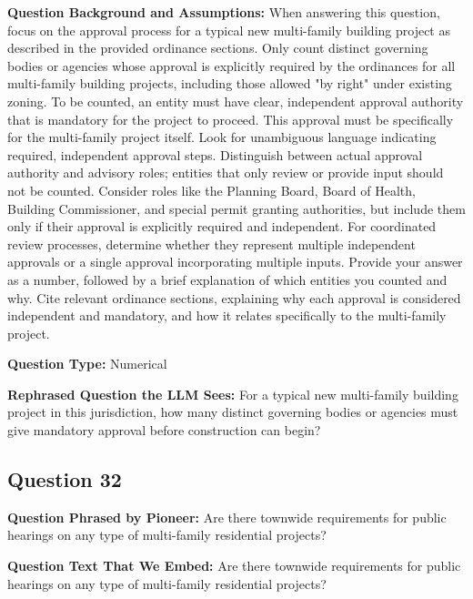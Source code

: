 \noindent\textbf{Question Background and Assumptions:} When answering this question, focus on the approval process for a typical new multi-family building project as described in the provided ordinance sections. Only count distinct governing bodies or agencies whose approval is explicitly required by the ordinances for all multi-family building projects, including those allowed "by right" under existing zoning.
To be counted, an entity must have clear, independent approval authority that is mandatory for the project to proceed. This approval must be specifically for the multi-family project itself. Look for unambiguous language indicating required, independent approval steps. Distinguish between actual approval authority and advisory roles; entities that only review or provide input should not be counted.
Consider roles like the Planning Board, Board of Health, Building Commissioner, and special permit granting authorities, but include them only if their approval is explicitly required and independent. For coordinated review processes, determine whether they represent multiple independent approvals or a single approval incorporating multiple inputs.
Provide your answer as a number, followed by a brief explanation of which entities you counted and why. Cite relevant ordinance sections, explaining why each approval is considered independent and mandatory, and how it relates specifically to the multi-family project.

\noindent\textbf{Question Type:} Numerical

\noindent\textbf{Rephrased Question the LLM Sees:} For a typical new multi-family building project in this jurisdiction, how many distinct governing bodies or agencies must give mandatory approval before construction can begin?

\vspace{1cm}
\subsection*{Question 32}
\noindent\textbf{Question Phrased by Pioneer:} Are there townwide requirements for public hearings on any type of multi-family residential projects?

\noindent\textbf{Question Text That We Embed:} Are there townwide requirements for public hearings on any type of multi-family residential projects?


